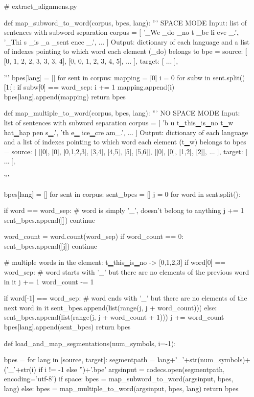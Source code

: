 \begin{python}
# extract_alignmens.py

def map_subword_to_word(corpus, bpes, lang):
  '''
  SPACE MODE
  Input: list of sentences with subword separation
  corpus =  [
      '_We _do _no t _be li eve _.',
      '_Thi s _is _a _sent ence _.',
      ...
  ]
  Output: dictionary of each language and 
  a list of indexes pointing to which word each element (_do) belongs to
  bpe = {
    source:
    [
      [0, 1, 2, 2, 3, 3, 3, 4],
      [0, 0, 1, 2, 3, 4, 5],
      ...
    ],
    target:
    [
      ...
    ],
  }
      
  '''
  bpes[lang] = []
  for sent in corpus:
    mapping = [0]
    i = 0
    for subw in sent.split()[1:]:
      if subw[0] == word_sep:
        i += 1
      mapping.append(i)
    bpes[lang].append(mapping)
  return bpes

def map_multiple_to_word(corpus, bpes, lang):
  '''
  NO SPACE MODE
  Input: list of sentences with subword separation
  corpus =  [
      'b u t▁this▁is▁no t▁w hat▁hap pen s▁.',
      'th e▁ ice▁cre am_.',
      ...
  ]
  Output: dictionary of each language and 
  a list of indexes pointing to which word each element (t▁w) belongs to
  bpes = {
    source:
    [
      [[0], [0], [0,1,2,3], [3,4], [4,5], [5], [5,6]],
      [[0], [0], [1,2], [2]],
      ...
    ],
    target:
    [
      ...
    ],
  }
      
  '''

  bpes[lang] = []
  for sent in corpus:
    sent_bpes = []
    j = 0
    for word in sent.split():

      if word == word_sep:
        # word is simply '_', doesn't belong to anything
        j += 1
        sent_bpes.append([])
        continue

      word_count = word.count(word_sep)
      if word_count == 0:
        sent_bpes.append([j])
        continue

      # multiple words in the element: t▁this▁is▁no -> [0,1,2,3]
      if word[0] == word_sep:
        # word starts with '_' but there are no elements of the previous word in it
        j += 1
        word_count -= 1

      if word[-1] == word_sep:
        # word ends with '_' but there are no elements of the next word in it
        sent_bpes.append(list(range(j, j + word_count)))
      else:
        sent_bpes.append(list(range(j, j + word_count + 1)))
      j += word_count
    bpes[lang].append(sent_bpes)
  return bpes

def load_and_map_segmentations(num_symbols, i=-1):

  bpes = {}
  for lang in [source, target]:
    segmentpath = lang+'_'+str(num_symbols)+('_'+str(i) if i != -1 else '')+'.bpe'
    argsinput = codecs.open(segmentpath, encoding='utf-8')
    if space:
        bpes = map_subword_to_word(argsinput, bpes, lang)
    else:
        bpes = map_multiple_to_word(argsinput, bpes, lang)
  return bpes
\end{python}

